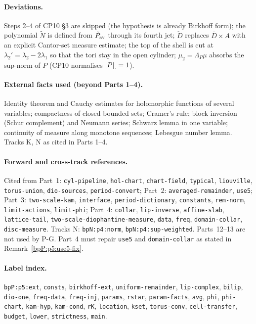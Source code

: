 \paragraph{Deviations.} Steps 2--4 of CP10 \S3 are skipped (the hypothesis is already Birkhoff form); the polynomial $\tilde N$ is defined from $\tilde P_{\rm av}$ through its fourth jet; $\check D$ replaces $\bar D\times A$ with an explicit Cantor-set measure estimate; the top of the shell is cut at $\lambda_2'=\lambda_2-2\lambda_1$ so that the tori stay in the open cylinder; $\mu_2=\Lambda_P\mu$ absorbs the sup-norm of $P$ (CP10 normalises $\lvert P\rvert_{,}=1$).
\paragraph{External facts used (beyond Parts 1--4).} Identity theorem and Cauchy estimates for holomorphic functions of several variables; compactness of closed bounded sets; Cramer's rule; block inversion (Schur complement) and Neumann series; Schwarz lemma in one variable; continuity of measure along monotone sequences; Lebesgue number lemma. Tracks K, N as cited in Parts 1--4.
\paragraph{Forward and cross-track references.} Cited from Part~1: \texttt{cyl-pipeline}, \texttt{hol-chart}, \texttt{chart-field}, \texttt{typical}, \texttt{liouville}, \texttt{torus-union}, \texttt{dio-sources}, \texttt{period-convert}; Part~2: \texttt{averaged-remainder}, \texttt{use5}; Part~3: \texttt{two-scale-kam}, \texttt{interface}, \texttt{period-dictionary}, \texttt{constants}, \texttt{rem-norm}, \texttt{limit-actions}, \texttt{limit-phi}; Part~4: \texttt{collar}, \texttt{lip-inverse}, \texttt{affine-slab}, \texttt{lattice-tail}, \texttt{two-scale-diophantine-measure}, \texttt{data}, \texttt{freq}, \texttt{domain-collar}, \texttt{disc-measure}. Tracks N: \texttt{bpN:p4:norm}, \texttt{bpN:p4:sup-weighted}. Parts~12--13 are not used by P-G. Part~4 must repair \texttt{use5} and \texttt{domain-collar} as stated in Remark~\ref{bpP:p5:use5-fix}.
\paragraph{Label index.} \texttt{bpP:p5:ext}, \texttt{consts}, \texttt{birkhoff-ext}, \texttt{uniform-remainder}, \texttt{lip-complex}, \texttt{bilip}, \texttt{dio-one}, \texttt{freq-data}, \texttt{freq-inj}, \texttt{params}, \texttt{rstar}, \texttt{param-facts}, \texttt{avg}, \texttt{phi}, \texttt{phi-chart}, \texttt{kam-hyp}, \texttt{kam-cond}, \texttt{rK}, \texttt{location}, \texttt{kset}, \texttt{torus-conv}, \texttt{cell-transfer}, \texttt{budget}, \texttt{lower}, \texttt{strictness}, \texttt{main}.
\endgroup
